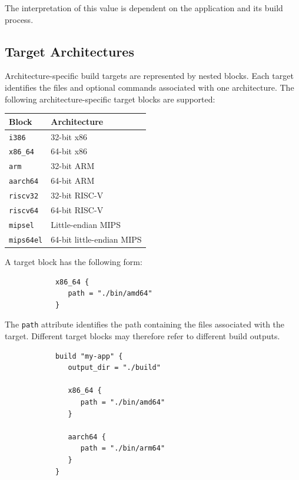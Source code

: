 \documentclass[11pt,a4paper]{article}
\begin{document}
    The interpretation of this value is dependent on the application and its build process.

    \subsection{Target Architectures}\label{subsec:target-architectures}

    Architecture-specific build targets are represented by nested blocks.
    Each target identifies the files and optional commands associated with one architecture.
    The following architecture-specific target blocks are supported:

    \begin{center}
        \begin{tabular}{ll}
            \textbf{Block}    & \textbf{Architecture}     \\
            \hline
            \texttt{i386}     & 32-bit x86                \\
            \texttt{x86\_64}  & 64-bit x86                \\
            \texttt{arm}      & 32-bit ARM                \\
            \texttt{aarch64}  & 64-bit ARM                \\
            \texttt{riscv32}  & 32-bit RISC-V             \\
            \texttt{riscv64}  & 64-bit RISC-V             \\
            \texttt{mipsel}   & Little-endian MIPS        \\
            \texttt{mips64el} & 64-bit little-endian MIPS \\
        \end{tabular}
    \end{center}

    A target block has the following form:

    \begin{center}
        \begin{verbatim}
            x86_64 {
               path = "./bin/amd64"
            }
        \end{verbatim}
    \end{center}

    The \texttt{path} attribute identifies the path containing the files associated with the target.
    Different target blocks may therefore refer to different build outputs.

    \begin{center}
        \begin{verbatim}
            build "my-app" {
               output_dir = "./build"

               x86_64 {
                  path = "./bin/amd64"
               }

               aarch64 {
                  path = "./bin/arm64"
               }
            }
        \end{verbatim}
    \end{center}
\end{document}
